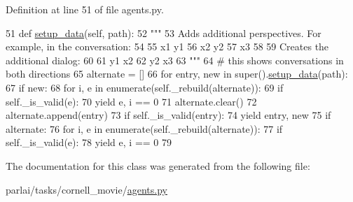 Definition at line 51 of file agents.\+py.


\begin{DoxyCode}
51     \textcolor{keyword}{def }\hyperlink{namespaceparlai_1_1tasks_1_1multinli_1_1agents_a4fa2cb0ba1ed745336ad8bceed36b841}{setup\_data}(self, path):
52         \textcolor{stringliteral}{"""}
53 \textcolor{stringliteral}{        Adds additional perspectives. For example, in the conversation:}
54 \textcolor{stringliteral}{}
55 \textcolor{stringliteral}{        x1 y1}
56 \textcolor{stringliteral}{        x2 y2}
57 \textcolor{stringliteral}{        x3}
58 \textcolor{stringliteral}{}
59 \textcolor{stringliteral}{        Creates the additional dialog:}
60 \textcolor{stringliteral}{}
61 \textcolor{stringliteral}{        y1 x2}
62 \textcolor{stringliteral}{        y2 x3}
63 \textcolor{stringliteral}{        """}
64         \textcolor{comment}{# this shows conversations in both directions}
65         alternate = []
66         \textcolor{keywordflow}{for} entry, new \textcolor{keywordflow}{in} super().\hyperlink{namespaceparlai_1_1tasks_1_1multinli_1_1agents_a4fa2cb0ba1ed745336ad8bceed36b841}{setup\_data}(path):
67             \textcolor{keywordflow}{if} new:
68                 \textcolor{keywordflow}{for} i, e \textcolor{keywordflow}{in} enumerate(self.\_rebuild(alternate)):
69                     \textcolor{keywordflow}{if} self.\_is\_valid(e):
70                         \textcolor{keywordflow}{yield} e, i == 0
71                 alternate.clear()
72             alternate.append(entry)
73             \textcolor{keywordflow}{if} self.\_is\_valid(entry):
74                 \textcolor{keywordflow}{yield} entry, new
75         \textcolor{keywordflow}{if} alternate:
76             \textcolor{keywordflow}{for} i, e \textcolor{keywordflow}{in} enumerate(self.\_rebuild(alternate)):
77                 \textcolor{keywordflow}{if} self.\_is\_valid(e):
78                     \textcolor{keywordflow}{yield} e, i == 0
79 \end{DoxyCode}


The documentation for this class was generated from the following file\+:\begin{DoxyCompactItemize}
\item 
parlai/tasks/cornell\+\_\+movie/\hyperlink{parlai_2tasks_2cornell__movie_2agents_8py}{agents.\+py}\end{DoxyCompactItemize}
